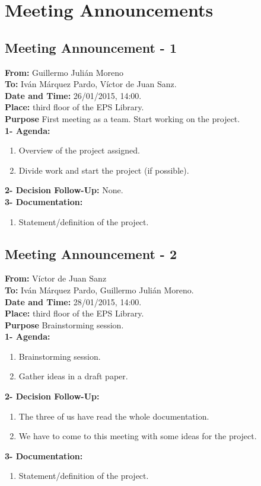 \section{Meeting Announcements}

\subsection{Meeting Announcement - 1}

\textbf{From: } Guillermo Julián Moreno\\
\textbf{To: } Iván Márquez Pardo, Víctor de Juan Sanz.\\
\textbf{Date and Time: } 26/01/2015, 14:00.\\
\textbf{Place: } third floor of the EPS Library.\\

\textbf{Purpose} First meeting as a team. Start working on the project.\\

\textbf{1- Agenda:}
\begin{enumerate}
\item Overview of the project assigned.
\item Divide work and start the project (if possible).
\end{enumerate}
\textbf{2- Decision Follow-Up:} None.\\
\textbf{3- Documentation:}
\begin{enumerate}
\item Statement/definition of the project.
\end{enumerate}


\subsection{Meeting Announcement - 2}

\textbf{From: } Víctor de Juan Sanz\\
\textbf{To: } Iván Márquez Pardo, Guillermo Julián Moreno.\\
\textbf{Date and Time: } 28/01/2015, 14:00.\\
\textbf{Place: } third floor of the EPS Library.\\

\textbf{Purpose} Brainstorming session.\\

\textbf{1- Agenda:}
\begin{enumerate}
\item Brainstorming session.
\item Gather ideas in a draft paper.
\end{enumerate}
\textbf{2- Decision Follow-Up:} 
\begin{enumerate}
\item The three of us have read the whole documentation.
\item We have to come to this meeting with some ideas for the project.
\end{enumerate}
\textbf{3- Documentation:}
\begin{enumerate}
\item Statement/definition of the project.
\end{enumerate}



